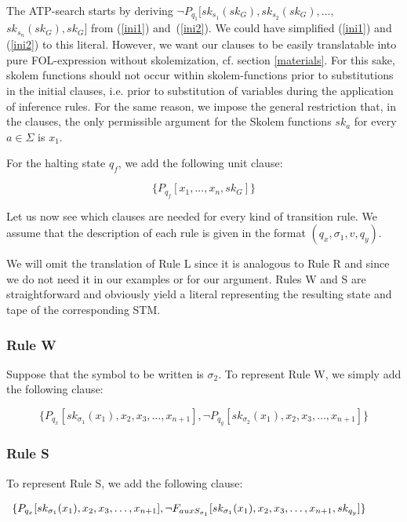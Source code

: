 \documentclass[%
  manuscript=article,   %
  year=2024,
  volume=77,
  doi=00000.000,
]{zfn}
\begin{document}
The ATP-search starts by deriving $\neg P_{q_1}[sk_{s_1}(sk_G),sk_{s_2}(sk_G), \ldots,$ $sk_{s_n}(sk_G), sk_G]$ from (\ref{ini1}) and~(\ref{ini2}). We could have simplified (\ref{ini1}) and (\ref{ini2}) to this literal. However, we want our clauses to be easily translatable into pure FOL-expression without skolemization, cf. section \ref{materials}. For this sake, skolem functions should not occur within skolem-functions prior to substitutions in the initial clauses, i.e. prior to substitution of variables during the application of inference rules. For the same reason,  we impose the general restriction that, in the clauses, the only permissible argument for the Skolem functions $sk_a$ for every $a \in \Sigma$ is $x_1$. \label{x1rest}

For the halting state $q_f$, we add the following unit clause:

\begin{equation}
\{P_{q_f}[x_1, ..., x_n, sk_G]\}
\end{equation}

Let us now see which clauses are needed for every kind of transition rule. We assume that the description of each rule is given in the format $(q_x, \sigma_1, v, q_y)$.

We will omit the translation of Rule L since it is analogous to Rule R and since we do not need it in our examples or for our argument. Rules W and S are straightforward and obviously yield a literal representing the resulting state and tape of the corresponding STM.

\subsubsection{Rule W}

Suppose that the symbol to be written is $\sigma_2$. To represent Rule W, we simply add the following clause:

\begin{equation}
 \{P_{q_x}[sk_{\sigma_1}(x_1), x_2, x_3, \ldots, x_{n+1}],
 \neg P_{q_y}[sk_{\sigma_2}(x_1), x_2, x_3, \ldots, x_{n+1}]\}
\end{equation}

\subsubsection{Rule S}

To represent Rule S, we add the following clause:

\begin{small}
\begin{equation}
\hspace{-0.95cm} \{P_{q_x}[sk_{\sigma_1}(x_1), x_2, x_3, \ldots, x_{n+1}],
 \neg F_{auxS_{\sigma_1}}[sk_{\sigma_1}(x_1), x_2, x_3, \ldots, x_{n+1}, sk_{q_y}]\}
\end{equation}
\end{small}
\end{document}
